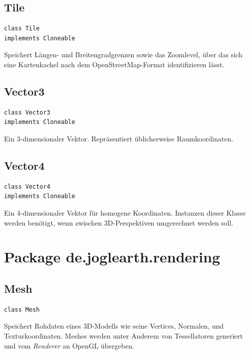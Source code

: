 \documentclass[10pt]{scrreprt}
\begin{document}
\vspace{5mm}
\subsection*{Tile}
\begin{lstlisting}
class Tile 
implements Cloneable
\end{lstlisting}
Speichert Längen- und Breitengradgrenzen sowie das Zoomlevel, über das sich eine Kartenkachel nach dem OpenStreetMap-Format identifizieren lässt.\\

\vspace{5mm}
\subsection*{Vector3}
\begin{lstlisting}
class Vector3
implements Cloneable
\end{lstlisting}
Ein 3-dimensionaler Vektor. Repräsentiert üblicherweise Raumkoordinaten.\\

\vspace{5mm}
\subsection*{Vector4}
\begin{lstlisting}
class Vector4
implements Cloneable
\end{lstlisting}
Ein 4-dimensionaler Vektor für homogene Koordinaten. Instanzen dieser Klasse werden benötigt, wenn zwischen 3D-Perspektiven umgerechnet werden soll.\\





\vspace{5mm}
\section{Package de.joglearth.rendering}
\subsection*{Mesh}
\begin{lstlisting}
class Mesh
\end{lstlisting}
Speichert Rohdaten eines 3D-Modells wie seine Vertices, Normalen, und Texturkoordinaten. Meshes werden unter Anderem von Tessellatoren generiert und vom \textit{Renderer} an OpenGL übergeben.\\
\end{document}
